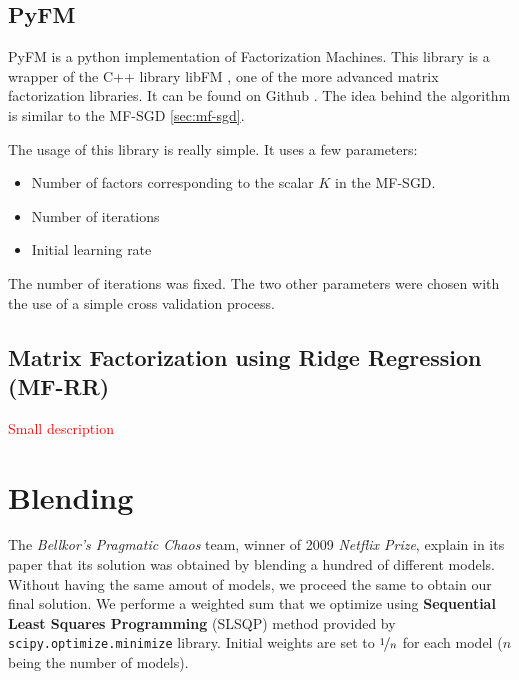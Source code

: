 \documentclass[10pt,conference,compsocconf]{IEEEtran}
\begin{document}
\subsection{PyFM}


PyFM is a python implementation of Factorization Machines. This library is a wrapper of the C++ library libFM \cite{rendle:tist2012}, one of the more advanced matrix factorization libraries. It can be found on Github \cite{pyfm}. The idea behind the algorithm is similar to the MF-SGD \ref{sec:mf-sgd}. 

The usage of this library is really simple. It uses a few parameters:
\begin{itemize}
 \item Number of factors corresponding to the scalar $K$ in the MF-SGD.
 \item Number of iterations
 \item Initial learning rate
\end{itemize}

The number of iterations was fixed. The two other parameters were chosen with the use of a simple cross validation process.

\subsection{Matrix Factorization using Ridge Regression (MF-RR)}

\textcolor{red}{Small description}

\section{Blending}
\label{sec:blending}

The \textit{Bellkor's Pragmatic Chaos} team, winner of 2009 \textit{Netflix Prize}, explain in its paper that its solution was obtained by blending a hundred of different models. \cite{BellKore_netflix} Without having the same amout of models, we proceed the same to obtain our final solution. We performe a weighted sum that we optimize using \textbf{Sequential Least Squares Programming} (SLSQP) method provided by \texttt{scipy.optimize.minimize} library. Initial weights are set to $\nicefrac{1}{n}$ for each model ($n$ being the number of models). 
\end{document}
